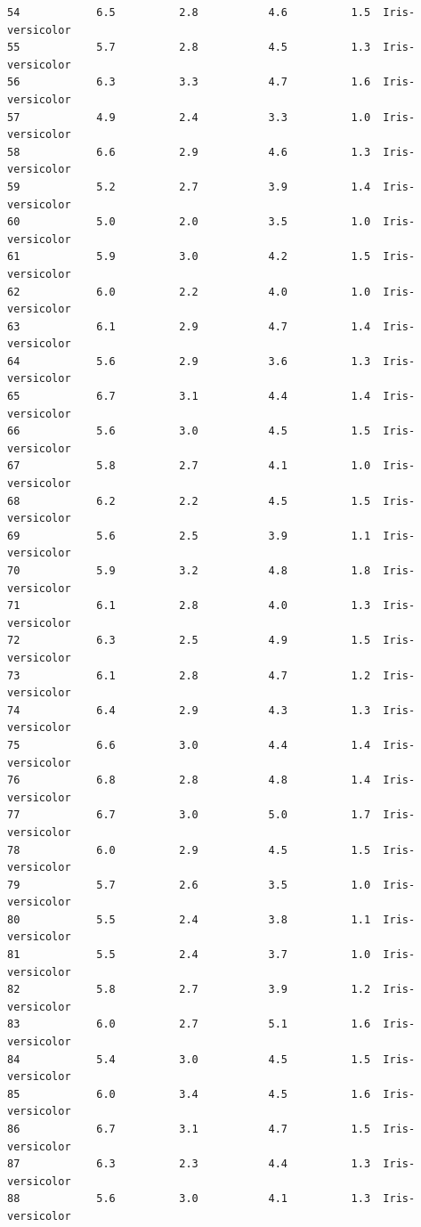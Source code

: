 \documentclass [oneside,10pt,a4paper,ngerman,BCOR10mm,headsepline,parindent,final]{scrartcl}
\begin{document}
\begin{tcolorbox}[breakable, size=fbox, boxrule=.5pt, pad at break*=1mm, opacityfill=0]
\begin{Verbatim}[commandchars=\\\{\}]
54            6.5          2.8           4.6          1.5  Iris-versicolor
55            5.7          2.8           4.5          1.3  Iris-versicolor
56            6.3          3.3           4.7          1.6  Iris-versicolor
57            4.9          2.4           3.3          1.0  Iris-versicolor
58            6.6          2.9           4.6          1.3  Iris-versicolor
59            5.2          2.7           3.9          1.4  Iris-versicolor
60            5.0          2.0           3.5          1.0  Iris-versicolor
61            5.9          3.0           4.2          1.5  Iris-versicolor
62            6.0          2.2           4.0          1.0  Iris-versicolor
63            6.1          2.9           4.7          1.4  Iris-versicolor
64            5.6          2.9           3.6          1.3  Iris-versicolor
65            6.7          3.1           4.4          1.4  Iris-versicolor
66            5.6          3.0           4.5          1.5  Iris-versicolor
67            5.8          2.7           4.1          1.0  Iris-versicolor
68            6.2          2.2           4.5          1.5  Iris-versicolor
69            5.6          2.5           3.9          1.1  Iris-versicolor
70            5.9          3.2           4.8          1.8  Iris-versicolor
71            6.1          2.8           4.0          1.3  Iris-versicolor
72            6.3          2.5           4.9          1.5  Iris-versicolor
73            6.1          2.8           4.7          1.2  Iris-versicolor
74            6.4          2.9           4.3          1.3  Iris-versicolor
75            6.6          3.0           4.4          1.4  Iris-versicolor
76            6.8          2.8           4.8          1.4  Iris-versicolor
77            6.7          3.0           5.0          1.7  Iris-versicolor
78            6.0          2.9           4.5          1.5  Iris-versicolor
79            5.7          2.6           3.5          1.0  Iris-versicolor
80            5.5          2.4           3.8          1.1  Iris-versicolor
81            5.5          2.4           3.7          1.0  Iris-versicolor
82            5.8          2.7           3.9          1.2  Iris-versicolor
83            6.0          2.7           5.1          1.6  Iris-versicolor
84            5.4          3.0           4.5          1.5  Iris-versicolor
85            6.0          3.4           4.5          1.6  Iris-versicolor
86            6.7          3.1           4.7          1.5  Iris-versicolor
87            6.3          2.3           4.4          1.3  Iris-versicolor
88            5.6          3.0           4.1          1.3  Iris-versicolor

\end{Verbatim}
\end{tcolorbox}
\end{document}
